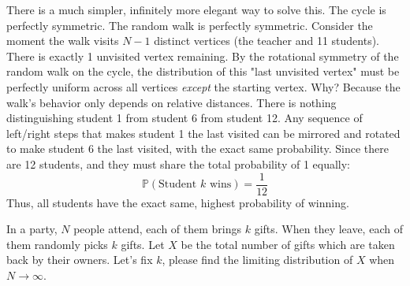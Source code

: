 \begin{solution}
There is a much simpler, infinitely more elegant way to solve this.
The cycle is perfectly symmetric. The random walk is perfectly symmetric.
Consider the moment the walk visits $N-1$ distinct vertices (the teacher and 11 students). There is exactly 1 unvisited vertex remaining.
By the rotational symmetry of the random walk on the cycle, the distribution of this "last unvisited vertex" must be perfectly uniform across all vertices \textit{except} the starting vertex.
Why? Because the walk's behavior only depends on relative distances. There is nothing distinguishing student 1 from student 6 from student 12. Any sequence of left/right steps that makes student 1 the last visited can be mirrored and rotated to make student 6 the last visited, with the exact same probability.
Since there are 12 students, and they must share the total probability of 1 equally:
\[ \mathbb{P}(\text{Student } k \text{ wins}) = \frac{1}{12} \]
Thus, all students have the exact same, highest probability of winning.
\end{solution}

\begin{exercise}\label{probability:2017:3}
In a party, $N$ people attend, each of them brings $k$ gifts. When they leave, each of them randomly picks $k$ gifts. Let $X$ be the total number of gifts which are taken back by their owners. Let's fix $k$, please find the limiting distribution of $X$ when $N \to \infty$.
\end{exercise}

